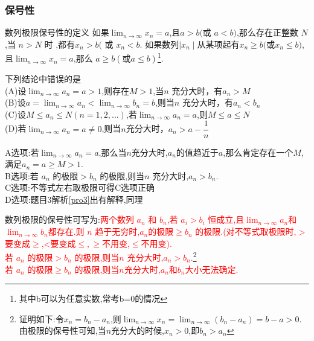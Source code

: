 \documentclass[8pt a4paper, oneside, UTF8]{ctexbook}
\begin{document}
\begin{sloppypar}
    \subsubsection{保号性}
    \begin{defn}{数列极限保号性的定义}{}
        如果$\lim_{n\to\infty}x_n=a$,且$a{>}b( $或 $a{<}b)$,那么存在正整数 $N$,当 $n{>}N$ 时 ,都有$x_n{>}b($ 或 $x_n{<}b$.\newline
        如果数列$\mid x_n\mid$从某项起有$x_n\geqslant b($或$x_n\leqslant b)$,且$\lim_{n\to\infty}x_n=a $,那么 $a\geqslant b( 或 a\leqslant b)$\footnote{其中b可以为任意实数,常考b=0的情况}.
    \end{defn}
    \begin{problem}
        下列结论中错误的是\\
        (A)设$\lim _{n\to\infty}a_n=a>1$,则存在$M>1$,当$n$ 充分大时，有$a_n>M$\\
        (B)设$a=\lim_{n\to\infty}a_n<\lim_{n\to\infty}b_n=b$,则当$n$ 充分大时，有$a_n<b_n$ \\
        (C)设$M\leqslant a_n\leqslant N(n=1,2,...)$,若$\lim_{n\to\infty} a_n=a$,则$M\leqslant a\leqslant N$ \\
        (D)若$\lim_{n\to\infty} a_n=a\neq0$,则当$n$充分大时，$a_n>a-\dfrac1n$ 
    \end{problem}
    \begin{solution}
        A选项:若$\lim_{n \to \infty}a_n=a$,那么当$n$充分大时,$a_n$的值趋近于$a$,那么肯定存在一个$M$,满足$a_n = a \geqslant M > 1.$\\
        B选项:若 $a_n$ 的极限$>b_n$ 的极限,则当$n$ 充分大时,$a_n>b_n$.\\
        C选项:不等式左右取极限可得C选项正确\\
        D选项:题目3解析\ref{pro3}出有解释,同理
    \end{solution}
    \begin{note}
        数列极限的保号性可写为:\textcolor{red}{两个数列 $a_n$ 和 $b_n$,若 $a_i>b_i$ 恒成立,且$\lim_{n \to \infty}a_n$和$\lim_{n\to \infty}b_n$都存在.则 $n$ 趋于无穷时,$a_n$的极限$\geqslant b_n$ 的极限.(对不等式取极限时,$>$要变成$\geqslant$,<要变成$\leqslant,\geqslant$不用变,$\leqslant$不用变).}\\
        \textcolor{red}{若 $a_n$ 的极限$>b_n$ 的极限,则当$n$ 充分大时,$a_n>b_n$.}\footnote{证明如下:令$x_n=b_n-a_n$,则$\lim_{n \to \infty}x_n=\lim_{n\to \infty}(b_n-a_n)=b-a>0$.由极限的保号性可知,当$n$充分大的时候,$x_n>0$,即$b_n>a_n$}\\
        \textcolor{red}{若 $a_n$ 的极限$\geqslant b_n$ 的极限,则当$n$充分大时,$a_n$和$b_n$大小无法确定.}
    \end{note}


\end{sloppypar}
\end{document}

